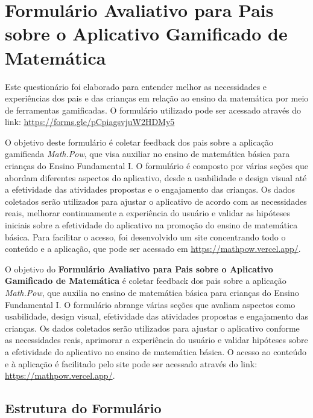 \section{Formulário Avaliativo para Pais sobre o Aplicativo Gamificado de Matemática}

Este questionário foi elaborado para entender melhor as necessidades e experiências dos pais e das crianças em relação ao ensino da matemática por meio de ferramentas gamificadas. O formulário utilizado pode ser acessado através do link: \url{https://forms.gle/pCpiagsvjuW2HDMy5}

O objetivo deste formulário é coletar feedback dos pais sobre a aplicação gamificada \textit{Math.Pow}, que visa auxiliar no ensino de matemática básica para crianças do Ensino Fundamental I. O formulário é composto por várias seções que abordam diferentes aspectos do aplicativo, desde a usabilidade e design visual até a efetividade das atividades propostas e o engajamento das crianças. Os dados coletados serão utilizados para ajustar o aplicativo de acordo com as necessidades reais, melhorar continuamente a experiência do usuário e validar as hipóteses iniciais sobre a efetividade do aplicativo na promoção do ensino de matemática básica. Para facilitar o acesso, foi desenvolvido um site concentrando todo o conteúdo e a aplicação, que pode ser acessado em \url{https://mathpow.vercel.app/}.

O objetivo do \textbf{Formulário Avaliativo para Pais sobre o Aplicativo Gamificado de Matemática} é coletar feedback dos pais sobre a aplicação \textit{Math.Pow}, que auxilia no ensino de matemática básica para crianças do Ensino Fundamental I. O formulário abrange várias seções que avaliam aspectos como usabilidade, design visual, efetividade das atividades propostas e engajamento das crianças. Os dados coletados serão utilizados para ajustar o aplicativo conforme as necessidades reais, aprimorar a experiência do usuário e validar hipóteses sobre a efetividade do aplicativo no ensino de matemática básica. O acesso ao conteúdo e à aplicação é facilitado pelo site pode ser acessado através do link: \url{https://mathpow.vercel.app/}.

\subsection*{Estrutura do Formulário}

